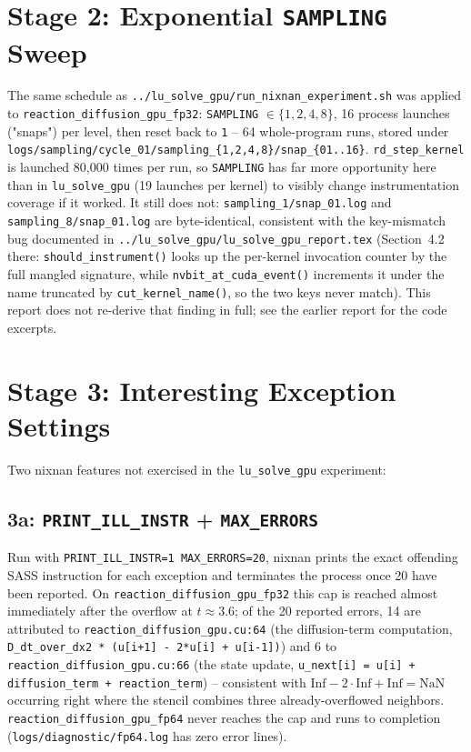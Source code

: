 \documentclass[11pt,a4paper]{article}
\begin{document}
\section{Stage 2: Exponential \texttt{SAMPLING} Sweep}
\label{sec:sampling}

The same schedule as \texttt{../lu\_solve\_gpu/run\_nixnan\_experiment.sh}
was applied to \texttt{reaction\_diffusion\_gpu\_fp32}: \texttt{SAMPLING}
$\in\{1,2,4,8\}$, 16 process launches ("snaps") per level, then reset back
to \texttt{1} -- 64 whole-program runs, stored under
\texttt{logs/sampling/cycle\_01/sampling\_\{1,2,4,8\}/snap\_\{01..16\}}.
\texttt{rd\_step\_kernel} is launched 80{,}000 times per run, so
\texttt{SAMPLING} has far more opportunity here than in
\texttt{lu\_solve\_gpu} (19 launches per kernel) to visibly change
instrumentation coverage if it worked. It still does not:
\texttt{sampling\_1/snap\_01.log} and \texttt{sampling\_8/snap\_01.log} are
byte-identical, consistent with the key-mismatch bug documented in
\texttt{../lu\_solve\_gpu/lu\_solve\_gpu\_report.tex}
(Section~4.2 there: \texttt{should\_instrument()} looks up the per-kernel
invocation counter by the full mangled signature, while
\texttt{nvbit\_at\_cuda\_event()} increments it under the name truncated by
\texttt{cut\_kernel\_name()}, so the two keys never match). This report does
not re-derive that finding in full; see the earlier report for the code
excerpts.

\section{Stage 3: Interesting Exception Settings}
\label{sec:stage3}

Two nixnan features not exercised in the \texttt{lu\_solve\_gpu} experiment:

\subsection{3a: \texttt{PRINT\_ILL\_INSTR} + \texttt{MAX\_ERRORS}}

Run with \texttt{PRINT\_ILL\_INSTR=1 MAX\_ERRORS=20}, nixnan prints the
exact offending SASS instruction for each exception and terminates the
process once 20 have been reported. On \texttt{reaction\_diffusion\_gpu\_fp32}
this cap is reached almost immediately after the overflow at $t\approx3.6$;
of the 20 reported errors, 14 are attributed to
\texttt{reaction\_diffusion\_gpu.cu:64} (the diffusion-term computation,
\texttt{D\_dt\_over\_dx2 * (u[i+1] - 2*u[i] + u[i-1])}) and 6 to
\texttt{reaction\_diffusion\_gpu.cu:66} (the state update,
\texttt{u\_next[i] = u[i] + diffusion\_term + reaction\_term}) --
consistent with $\text{Inf} - 2\cdot\text{Inf} + \text{Inf} = \text{NaN}$
occurring right where the stencil combines three already-overflowed
neighbors. \texttt{reaction\_diffusion\_gpu\_fp64} never reaches the cap
and runs to completion (\texttt{logs/diagnostic/fp64.log} has zero error
lines).
\end{document}
